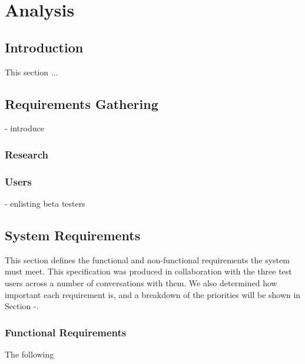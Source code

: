 \chapter{Analysis}
\section{Introduction}
This section ...

\section{Requirements Gathering}
- introduce

\subsection{Research}

\subsection{Users}
- enlisting beta testers

\section{System Requirements}
This section defines the functional and non-functional requirements the system must meet. This specification was produced in collaboration with the three test users across a number of conversations with them. We also determined how important each requirement is, and a breakdown of the priorities will be shown in Section -.

\subsection{Functional Requirements}
The following 
